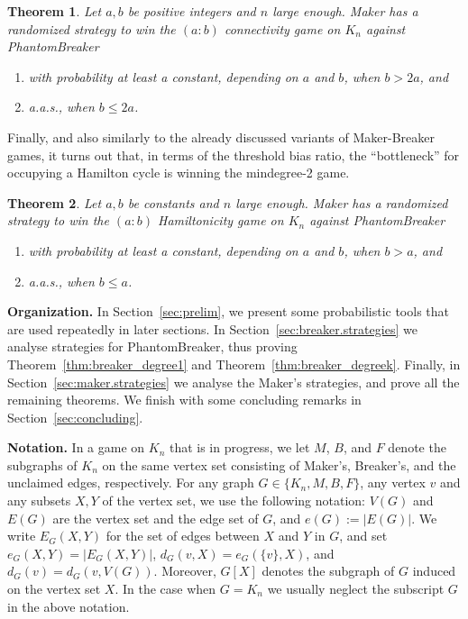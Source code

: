 \documentclass[11pt, a4paper]{article}
\numberwithin{equation}{section}
\numberwithin{figure}{section}
\newtheorem{theorem}{Theorem}
\begin{document}
\begin{theorem} \label{thm:maker_connectivity}
Let $a,b$ be positive integers and $n$ large enough. Maker has a randomized strategy to win the $(a:b)$ connectivity game on $K_n$ against PhantomBreaker
\begin{enumerate}[label =(\alph*)]
    \item \label{conn_large_b} with probability at least a constant, depending on $a$ and $b$, when $b> 2a$, and
    \item \label{conn_small_b} a.a.s., when $b\leq 2a$.
\end{enumerate}
\end{theorem}



Finally, and also similarly 
to the already discussed variants
of Maker-Breaker games, it turns out that, in terms of the threshold bias ratio,
the ``bottleneck'' for occupying a Hamilton cycle is winning the mindegree-2 game. 

\begin{theorem} \label{thm:maker_hamilton}
Let $a,b$ be constants and $n$ large enough. 
Maker has a randomized strategy to win the 
$(a:b)$ Hamiltonicity game on $K_n$ against PhantomBreaker
\begin{enumerate}[label=(\alph*)]
    \item \label{ham_large_b} with probability at least
a constant, depending on $a$ and $b$, when $b > a$, and 
    \item \label{ham_small_b} a.a.s., when $b\leq a$.
\end{enumerate}
\end{theorem}



\bigskip


\noindent\textbf{Organization.}
In Section~\ref{sec:prelim}, we present some probabilistic tools that are used repeatedly in later sections. In Section~\ref{sec:breaker.strategies} we analyse strategies
for PhantomBreaker, thus proving Theorem~\ref{thm:breaker_degree1} and Theorem~\ref{thm:breaker_degreek}.
Finally, in Section~\ref{sec:maker.strategies} we analyse the Maker's strategies, and prove all the remaining theorems. We finish with some concluding remarks in Section~\ref{sec:concluding}.


\bigskip

\noindent\textbf{Notation.}
In a game on $K_n$ that is in progress, we let $M$, $B$, and $F$ denote the subgraphs of $K_n$ on the same vertex set consisting of Maker's, Breaker's, and the unclaimed edges, respectively.
For any graph $G\in\{K_n,M,B,F\}$, any vertex $v$ and any subsets $X,Y$ of the vertex set, we use the following notation:
$V(G)$ and $E(G)$ are the vertex set and the edge set of $G$, and $e(G):=|E(G)|$.
We write $E_G(X,Y)$ for the set of edges between $X$ and $Y$ in $G$, and set $e_G(X,Y)=|E_G(X,Y)|$,
$d_G(v,X)=e_G(\{v\},X)$, and $d_G(v)=d_G(v,V(G))$. Moreover, $G[X]$ denotes the subgraph of $G$ induced
on the vertex set $X$. In the case when $G=K_n$ we usually neglect the subscript $G$ in the above notation.
\end{document}
